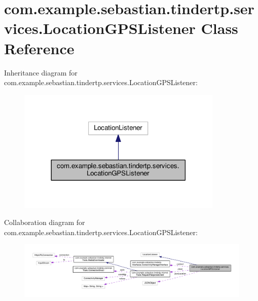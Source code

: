 \hypertarget{classcom_1_1example_1_1sebastian_1_1tindertp_1_1services_1_1LocationGPSListener}{}\section{com.\+example.\+sebastian.\+tindertp.\+services.\+Location\+G\+P\+S\+Listener Class Reference}
\label{classcom_1_1example_1_1sebastian_1_1tindertp_1_1services_1_1LocationGPSListener}


Inheritance diagram for com.\+example.\+sebastian.\+tindertp.\+services.\+Location\+G\+P\+S\+Listener\+:\nopagebreak
\begin{figure}[H]
\begin{center}
\leavevmode
\includegraphics[width=278pt]{classcom_1_1example_1_1sebastian_1_1tindertp_1_1services_1_1LocationGPSListener__inherit__graph}
\end{center}
\end{figure}


Collaboration diagram for com.\+example.\+sebastian.\+tindertp.\+services.\+Location\+G\+P\+S\+Listener\+:
\nopagebreak
\begin{figure}[H]
\begin{center}
\leavevmode
\includegraphics[width=350pt]{classcom_1_1example_1_1sebastian_1_1tindertp_1_1services_1_1LocationGPSListener__coll__graph}
\end{center}
\end{figure}
